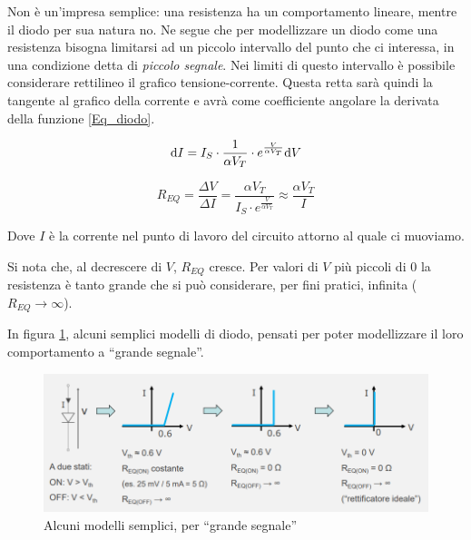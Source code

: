 \documentclass{article}
\begin{document}
Non è un'impresa semplice: una resistenza ha un comportamento lineare, mentre il diodo per sua natura no. Ne segue che per modellizzare un diodo come una resistenza bisogna limitarsi ad un piccolo intervallo del punto che ci interessa, in una condizione detta di \textit{piccolo segnale}. Nei limiti di questo intervallo è possibile considerare rettilineo il grafico tensione-corrente. Questa retta sarà quindi la tangente al grafico della corrente e avrà come coefficiente angolare la derivata della funzione \ref{Eq_diodo}.

\[\textrm d I = I_S \cdot \frac{1}{\alpha V_T} \cdot e^{\frac{V}{\alpha V_T}} \textrm d V\]

\[R_{EQ} = \frac{\Delta V}{\Delta I} = \frac{\alpha V_T}{I_S \cdot e^{\frac{V}{\alpha V_T}}} \approx \frac{\alpha V_T}{I}\]

Dove $I$ è la corrente nel punto di lavoro del circuito attorno al quale ci muoviamo.

\vspace{1mm}

Si nota che, al decrescere di $V$, $R_{EQ}$ cresce. Per valori di $V$ più piccoli di $0$ la resistenza è tanto grande che si può considerare, per fini pratici, infinita ($R_{EQ} \rightarrow \infty$).

\vspace{1mm}

In figura \ref{Schema_diodo_modelli}, alcuni semplici modelli di diodo, pensati per poter modellizzare il loro comportamento a ``grande segnale''.

\begin{figure}[h]
  \centering
  \includegraphics[scale=0.7]{IM_diodo_modelli}
  \caption{Alcuni modelli semplici, per ``grande segnale''}
  \label{Schema_diodo_modelli}
\end{figure}
\end{document}
